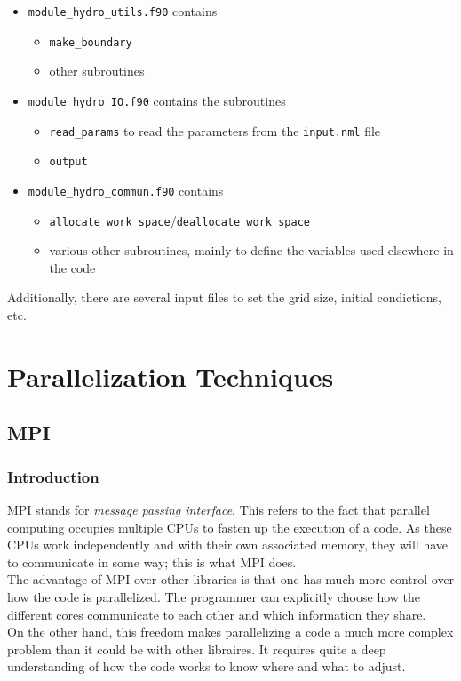 \documentclass[12pt, a4paper, titlepage]{article}
\newcounter{def}
\begin{document}
{\begin{itemize}
\begin{itemize}
\begin{itemize}
		\end{itemize}
	\end{itemize}
	\item \texttt{module\_hydro\_utils.f90} contains
	\begin{itemize}
		\item \texttt{make\_boundary}
		\item other subroutines
	\end{itemize}
	\item \texttt{module\_hydro\_IO.f90} contains the subroutines
	\begin{itemize}
		\item \texttt{read\_params} to read the parameters from the \texttt{input.nml} file
		\item \texttt{output}
	\end{itemize}
	\item \texttt{module\_hydro\_commun.f90} contains 
	\begin{itemize}
		\item \texttt{allocate\_work\_space}/\texttt{deallocate\_work\_space}
		\item various other subroutines, mainly to define the variables used elsewhere in the code
	\end{itemize}		
\end{itemize}

Additionally, there are several input files to set the grid size, initial condictions, etc.








\section{Parallelization Techniques}
\subsection{MPI}

\subsubsection{Introduction}
MPI stands for \textit{message passing interface}. This refers to the fact that parallel computing occupies multiple CPUs to fasten up the execution of a code. As these CPUs work independently and with their own associated memory, they will have to communicate in some way; this is what MPI does.\\
The advantage of MPI over other libraries is that one has much more control over how the code is parallelized. The programmer can explicitly choose how the different cores communicate to each other and which information they share.\\
On the other hand, this freedom makes parallelizing a code a much more complex problem than it could be with other libraires. It requires quite a deep understanding of how the code works to know where and what to adjust.


}
\end{document}
